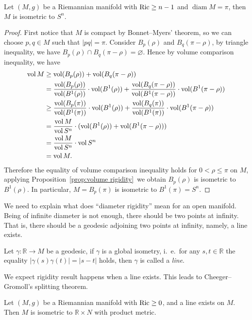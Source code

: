 \begin{thm}
    Let $(M,g)$ be a Riemannian manifold with $\operatorname{Ric}\geq n-1$ and $\operatorname{diam}{M}=\pi$, then $M$ is isometric to $S^n$.
\end{thm}
\begin{proof}
    First notice that $M$ is compact by Bonnet--Myers' theorem, so we can choose $p,q\in M$ such that $|pq|=\pi$.
    Consider $B_p(\rho)$ and $B_q(\pi-\rho)$, by triangle inequality, we have $B_p(\rho)\cap B_q(\pi-\rho)=\varnothing$.
    Hence by volume comparison inequality, we have
    \begin{align*}
        \operatorname{vol}{M}&\geq\operatorname{vol}(B_p(\rho))+\operatorname{vol}(B_q(\pi-\rho))\\
        &=\frac{\operatorname{vol}(B_p(\rho))}{\operatorname{vol}(B^1(\rho))}\cdot\operatorname{vol}(B^1(\rho))+\frac{\operatorname{vol}(B_q(\pi-\rho))}{\operatorname{vol}(B^1(\pi-\rho))}\cdot\operatorname{vol}(B^1(\pi-\rho))\\
        &\geq\frac{\operatorname{vol}(B_p(\pi))}{\operatorname{vol}(B^1(\pi))}\cdot\operatorname{vol}(B^1(\rho))+\frac{\operatorname{vol}(B_q(\pi))}{\operatorname{vol}(B^1(\pi))}\cdot\operatorname{vol}(B^1(\pi-\rho))\\
        &=\frac{\operatorname{vol}{M}}{\operatorname{vol}{S^n}}\cdot(\operatorname{vol}(B^1(\rho))+\operatorname{vol}(B^1(\pi-\rho)))\\
        &=\frac{\operatorname{vol}{M}}{\operatorname{vol}{S^n}}\cdot\operatorname{vol}{S^n}\\
        &=\operatorname{vol}{M}.
    \end{align*}
    Therefore the equality of volume comparison inequality holds for $0<\rho\leq\pi$ on $M$, applying Proposition~\ref{prop:volume rigidity}~we obtain $B_p(\rho)$ is isometric to $B^1(\rho)$.
    In particular, $M=B_p(\pi)$ is isometric to $B^1(\pi)=S^n$.
\end{proof}

We need to explain what does ``diameter rigidity'' mean for an open manifold.
Being of infinite diameter is not enough, there should be two points at infinity.
That is, there should be a geodesic adjoining two points at infinity, namely, a line exists.

\begin{defn}
    Let $\gamma:\mathbb{R}\to M$ be a geodesic, if $\gamma$ is a global isometry, i.\ e.\ for any $s,t\in\mathbb{R}$ the equality $|\gamma(s)\gamma(t)|=|s-t|$ holds, then $\gamma$ is called a \emph{line}.
\end{defn}

We expect rigidity result happens when a line exists.
This leads to Cheeger--Gromoll's splitting theorem.

\begin{thm}[Splitting]
    Let $(M,g)$ be a Riemannian manifold with $\operatorname{Ric}\geq 0$, and a line exists on $M$.
    Then $M$ is isometric to $\mathbb{R}\times N$ with product metric.
\end{thm}

